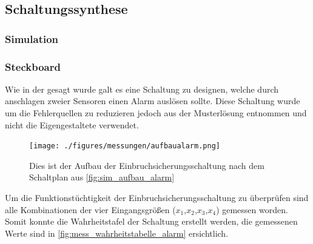 \documentclass[12pt,english,ngerman]{scrartcl}
\begin{document}

\subsection{Schaltungssynthese}
\subsubsection{Simulation}


\begin{figure}[H]
  \centering
  \caption{}
  \label{fig:sim_aufbau_alarm}
\end{figure}




\subsubsection{Steckboard}
Wie in der  gesagt wurde galt es eine Schaltung
zu designen, welche durch anschlagen zweier Sensoren einen Alarm auslösen
sollte. Diese Schaltung wurde um die Fehlerquellen zu reduzieren jedoch aus der
Musterlösung entnommen und nicht die Eigengestaltete verwendet.


\begin{figure}[H]
  \centering
    \texttt{[image: ./figures/messungen/aufbaualarm.png]}
  \caption{Dies ist der Aufbau der Einbruchsicherungsschaltung nach dem
  Schaltplan aus \autoref{fig:sim_aufbau_alarm}}
  \label{fig:mess_aufbau_alarm}
\end{figure}

Um die Funktionstüchtigkeit der Einbruchsicherungsschaltung zu überprüfen
sind alle Kombinationen der vier Eingangsgrößen ($x_1$,$x_2$,$x_3$,$x_4$)
gemessen worden. Somit konnte die Wahrheitstafel der Schaltung erstellt werden,
die gemessenen Werte sind in \autoref{fig:mess_wahrheitstabelle_alarm}
ersichtlich.
\end{document}

